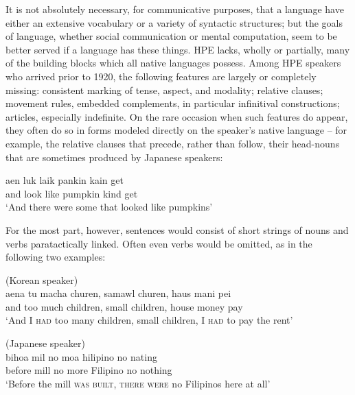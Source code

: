 It is not absolutely necessary, for communicative purposes, that a language have either an extensive vocabulary or a variety of syntactic structures; but the goals of language, whether social communication or mental computation, seem to be better served if a language has these things. HPE lacks, wholly or partially, many of the building blocks which all native languages possess. Among HPE speakers who arrived prior to 1920, the following features are largely or completely missing: consistent marking of tense, aspect, and modality; relative clauses; movement rules, embedded complements, in particular infinitival con\-structions; articles, especially indefinite. On the rare occasion when such features do appear, they often do so in forms modeled directly on the speaker's native language -- for example, the relative clauses that precede, rather than follow, their head-nouns that are sometimes produced by Japanese speakers:

\ea\label{ex:14}
\gll aen luk laik pankin kain get\\
and look like pumpkin kind get \\
\glt  `And there were some that looked like pumpkins'
\z

For the most part, however, sentences would consist of short strings of nouns and verbs paratactically linked. Often even verbs would be omitted, as in the following two examples:\newpage

\ea\label{ex:15}
{(Korean speaker)}\\
\gll aena tu macha churen, samawl churen, haus mani pei\\
and too much children, small children, house money pay\\
\glt `And I \textsc{had} too many children, small children, I \textsc{had} to pay the rent'
\z{}

\ea\label{ex:16}
{(Japanese speaker)}\\
\gll bihoa mil no moa hilipino no nating\\
before mill no more Filipino no nothing\\ 
\glt  `Before the mill \textsc{was built, there were} no Filipinos here at all' 
\z

